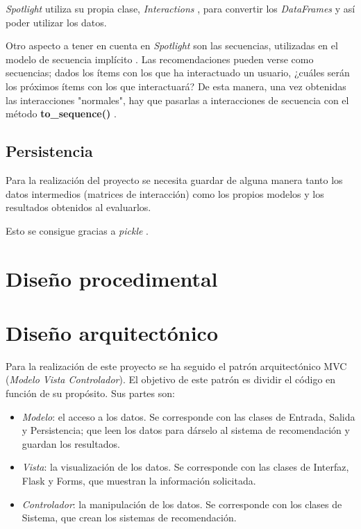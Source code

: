 \textit{Spotlight} utiliza su propia clase, \textit{Interactions} \cite{interactions-spotlight}, para convertir los \textit{DataFrames} y así poder utilizar los datos.

Otro aspecto a tener en cuenta en \textit{Spotlight} son las secuencias, utilizadas en el modelo de secuencia implícito \cite{modelo-secuencia}. Las recomendaciones pueden verse como secuencias; dados los ítems con los que ha interactuado un usuario, ¿cuáles serán los próximos ítems con los que interactuará? De esta manera, una vez obtenidas las interacciones "normales", hay que pasarlas a interacciones de secuencia con el método \textbf{to\_sequence()} \cite{to_sequence}.

\subsection{Persistencia}\label{persistencia}
Para la realización del proyecto se necesita guardar de alguna manera tanto los datos intermedios (matrices de interacción) como los propios modelos y los resultados obtenidos al evaluarlos.

Esto se consigue gracias a \textit{pickle} \cite{pickle}.

\section{Diseño procedimental}

\section{Diseño arquitectónico}
Para la realización de este proyecto se ha seguido el patrón arquitectónico MVC (\textit{Modelo Vista Controlador}). El objetivo de este patrón es dividir el código en función de su propósito. Sus partes son:
\begin{itemize}
\tightlist
\item \textit{Modelo}: el acceso a los datos. Se corresponde con las clases de Entrada, Salida y Persistencia; que leen los datos para dárselo al sistema de recomendación y guardan los resultados.
\item \textit{Vista}: la visualización de los datos. Se corresponde con las clases de Interfaz, Flask y Forms, que muestran la información solicitada.
\item \textit{Controlador}: la manipulación de los datos. Se corresponde con los clases de Sistema, que crean los sistemas de recomendación.
\end{itemize}

